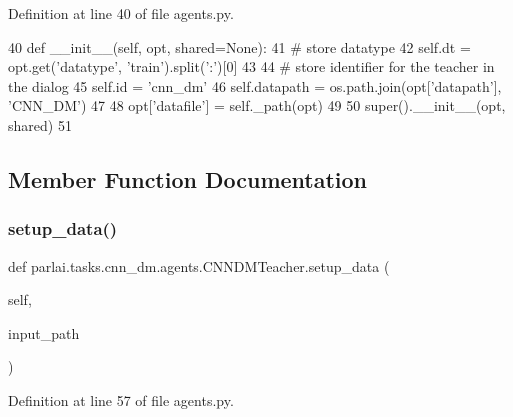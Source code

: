 Definition at line 40 of file agents.\+py.


\begin{DoxyCode}
40     \textcolor{keyword}{def }\_\_init\_\_(self, opt, shared=None):
41         \textcolor{comment}{# store datatype}
42         self.dt = opt.get(\textcolor{stringliteral}{'datatype'}, \textcolor{stringliteral}{'train'}).split(\textcolor{stringliteral}{':'})[0]
43 
44         \textcolor{comment}{# store identifier for the teacher in the dialog}
45         self.id = \textcolor{stringliteral}{'cnn\_dm'}
46         self.datapath = os.path.join(opt[\textcolor{stringliteral}{'datapath'}], \textcolor{stringliteral}{'CNN\_DM'})
47 
48         opt[\textcolor{stringliteral}{'datafile'}] = self.\_path(opt)
49 
50         super().\_\_init\_\_(opt, shared)
51 
\end{DoxyCode}


\subsection{Member Function Documentation}
\mbox{\label{classparlai_1_1tasks_1_1cnn__dm_1_1agents_1_1CNNDMTeacher_a9a63c8f71f6830b41a53d39d6922eeef}} 
\subsubsection{\texorpdfstring{setup\+\_\+data()}{setup\_data()}}
{\footnotesize\ttfamily def parlai.\+tasks.\+cnn\+\_\+dm.\+agents.\+C\+N\+N\+D\+M\+Teacher.\+setup\+\_\+data (\begin{DoxyParamCaption}\item[{}]{self,  }\item[{}]{input\+\_\+path }\end{DoxyParamCaption})}



Definition at line 57 of file agents.\+py.


